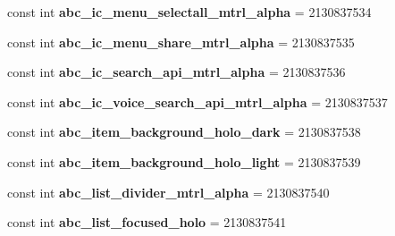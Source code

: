 \begin{DoxyCompactItemize}
\item 
\hypertarget{classClient_1_1Droid_1_1Resource_1_1Drawable_afb9e01bc1041c953697f8bf42275a367}{}const int {\bfseries abc\+\_\+ic\+\_\+menu\+\_\+selectall\+\_\+mtrl\+\_\+alpha} = 2130837534\label{classClient_1_1Droid_1_1Resource_1_1Drawable_afb9e01bc1041c953697f8bf42275a367}

\item 
\hypertarget{classClient_1_1Droid_1_1Resource_1_1Drawable_a2ae8db2f33452815942a1a2d741aa65c}{}const int {\bfseries abc\+\_\+ic\+\_\+menu\+\_\+share\+\_\+mtrl\+\_\+alpha} = 2130837535\label{classClient_1_1Droid_1_1Resource_1_1Drawable_a2ae8db2f33452815942a1a2d741aa65c}

\item 
\hypertarget{classClient_1_1Droid_1_1Resource_1_1Drawable_a1cca44c921fa6ff4592cde7bb1581e24}{}const int {\bfseries abc\+\_\+ic\+\_\+search\+\_\+api\+\_\+mtrl\+\_\+alpha} = 2130837536\label{classClient_1_1Droid_1_1Resource_1_1Drawable_a1cca44c921fa6ff4592cde7bb1581e24}

\item 
\hypertarget{classClient_1_1Droid_1_1Resource_1_1Drawable_a7c1a37ce815c1ab19dcdcce515a436c4}{}const int {\bfseries abc\+\_\+ic\+\_\+voice\+\_\+search\+\_\+api\+\_\+mtrl\+\_\+alpha} = 2130837537\label{classClient_1_1Droid_1_1Resource_1_1Drawable_a7c1a37ce815c1ab19dcdcce515a436c4}

\item 
\hypertarget{classClient_1_1Droid_1_1Resource_1_1Drawable_aa13df21cac475823ce5c91907299f1be}{}const int {\bfseries abc\+\_\+item\+\_\+background\+\_\+holo\+\_\+dark} = 2130837538\label{classClient_1_1Droid_1_1Resource_1_1Drawable_aa13df21cac475823ce5c91907299f1be}

\item 
\hypertarget{classClient_1_1Droid_1_1Resource_1_1Drawable_a518a64b6d9987ba7911a1af95f5c3b13}{}const int {\bfseries abc\+\_\+item\+\_\+background\+\_\+holo\+\_\+light} = 2130837539\label{classClient_1_1Droid_1_1Resource_1_1Drawable_a518a64b6d9987ba7911a1af95f5c3b13}

\item 
\hypertarget{classClient_1_1Droid_1_1Resource_1_1Drawable_af50e73609f8952de3dca9f61aa9b3e55}{}const int {\bfseries abc\+\_\+list\+\_\+divider\+\_\+mtrl\+\_\+alpha} = 2130837540\label{classClient_1_1Droid_1_1Resource_1_1Drawable_af50e73609f8952de3dca9f61aa9b3e55}

\item 
\hypertarget{classClient_1_1Droid_1_1Resource_1_1Drawable_a219964cbd6d0ead6984afeae6ca22e73}{}const int {\bfseries abc\+\_\+list\+\_\+focused\+\_\+holo} = 2130837541\label{classClient_1_1Droid_1_1Resource_1_1Drawable_a219964cbd6d0ead6984afeae6ca22e73}


\end{DoxyCompactItemize}
